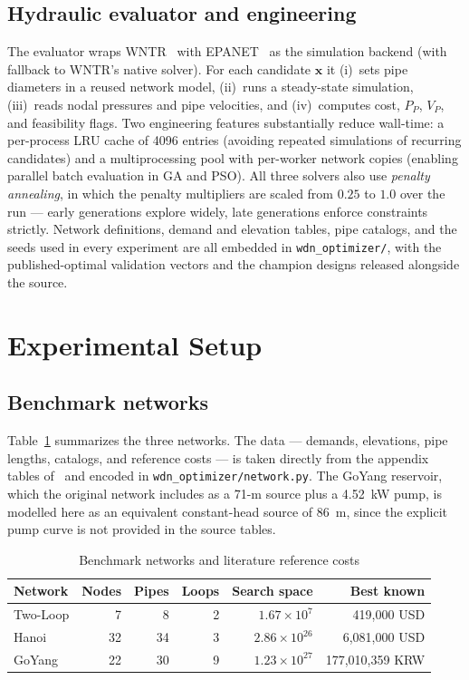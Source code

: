 \documentclass[conference]{IEEEtran}
\begin{document}
\subsection{Hydraulic evaluator and engineering}
\label{sec:hydraulics}
The evaluator wraps WNTR~\cite{wntr} with EPANET~\cite{rossman2000} as the simulation backend (with fallback to WNTR's native solver). For each candidate $\mathbf{x}$ it (i)~sets pipe diameters in a reused network model, (ii)~runs a steady-state simulation, (iii)~reads nodal pressures and pipe velocities, and (iv)~computes cost, $P_P$, $V_P$, and feasibility flags. Two engineering features substantially reduce wall-time: a per-process LRU cache of 4096 entries (avoiding repeated simulations of recurring candidates) and a multiprocessing pool with per-worker network copies (enabling parallel batch evaluation in GA and PSO). All three solvers also use \emph{penalty annealing}, in which the penalty multipliers are scaled from $0.25$ to $1.0$ over the run --- early generations explore widely, late generations enforce constraints strictly. Network definitions, demand and elevation tables, pipe catalogs, and the seeds used in every experiment are all embedded in \texttt{wdn\_optimizer/}, with the published-optimal validation vectors and the champion designs released alongside the source.

\section{Experimental Setup}
\label{sec:setup}
\subsection{Benchmark networks}
Table~\ref{tab:benchmarks} summarizes the three networks. The data --- demands, elevations, pipe lengths, catalogs, and reference costs --- is taken directly from the appendix tables of~\cite{sangroula2022} and encoded in \texttt{wdn\_optimizer/network.py}. The GoYang reservoir, which the original network includes as a 71-m source plus a 4.52~kW pump, is modelled here as an equivalent constant-head source of 86~m, since the explicit pump curve is not provided in the source tables.

\begin{table}[t]
\caption{Benchmark networks and literature reference costs}
\label{tab:benchmarks}
\centering
\begin{tabular}{lrrrrr}
\toprule
Network & Nodes & Pipes & Loops & Search space & Best known \\
\midrule
Two-Loop & 7 & 8 & 2 & $1.67\!\times\!10^{7}$ & 419{,}000 USD \\
Hanoi & 32 & 34 & 3 & $2.86\!\times\!10^{26}$ & 6{,}081{,}000 USD \\
GoYang & 22 & 30 & 9 & $1.23\!\times\!10^{27}$ & 177{,}010{,}359 KRW \\
\bottomrule
\end{tabular}
\end{table}
\end{document}
